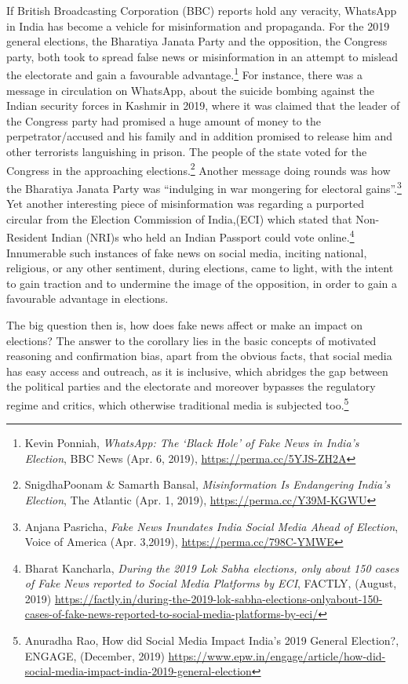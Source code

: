 \begin{multicols}{2}
\noi
If British Broadcasting Corporation (BBC) reports hold any veracity, WhatsApp in India has
become a vehicle for misinformation and propaganda. For the 2019 general elections, the
Bharatiya Janata Party and the opposition, the Congress party, both took to spread false news
or misinformation in an attempt to mislead the electorate and gain a favourable
advantage.\footnote{Kevin Ponniah, \textit{WhatsApp: The ‘Black Hole’ of Fake News in India’s Election}, BBC News (Apr. 6,
2019), \url{https://perma.cc/5YJS-ZH2A}}
For instance, there was a message in circulation on WhatsApp, about the suicide
bombing against the Indian security forces in Kashmir in 2019, where it was claimed that the
leader of the Congress party had promised a huge amount of money to the
perpetrator/accused and his family and in addition promised to release him and other
terrorists languishing in prison. The people of the state voted for the Congress in the 
approaching elections.\footnote{SnigdhaPoonam \& Samarth Bansal, \textit{Misinformation Is Endangering India’s Election}, The Atlantic (Apr. 1,
2019), \url{https://perma.cc/Y39M-KGWU}} Another message doing rounds was how the Bharatiya Janata Party
was “indulging in war mongering for electoral gains”.\footnote{Anjana Pasricha, \textit{Fake News Inundates India Social Media Ahead of Election}, Voice of America (Apr. 3,2019), \url{https://perma.cc/798C-YMWE}} Yet another interesting piece of
misinformation was regarding a purported circular from the Election Commission of
India,(ECI) which stated that Non-Resident Indian (NRI)s who held an Indian Passport could
vote online.\footnote{Bharat Kancharla, \textit{During the 2019 Lok Sabha elections, only about 150 cases of Fake News reported to Social
Media Platforms by ECI}, FACTLY, (August, 2019) \url{https://factly.in/during-the-2019-lok-sabha-elections-onlyabout-150-cases-of-fake-news-reported-to-social-media-platforms-by-eci/}} Innumerable such instances of fake news on social media, inciting national,
religious, or any other sentiment, during elections, came to light, with the intent to gain
traction and to undermine the image of the opposition, in order to gain a favourable
advantage in elections.


\noi
The big question then is, how does fake news affect or make an impact on elections? The
answer to the corollary lies in the basic concepts of motivated reasoning and confirmation
bias, apart from the obvious facts, that social media has easy access and outreach, as it is
inclusive, which abridges the gap between the political parties and the electorate and
moreover bypasses the regulatory regime and critics, which otherwise traditional media is
subjected too.\footnote{Anuradha Rao, How did Social Media Impact India’s 2019 General Election?, ENGAGE, (December, 2019)
\url{https://www.epw.in/engage/article/how-did-social-media-impact-india-2019-general-election}}


\end{multicols}
